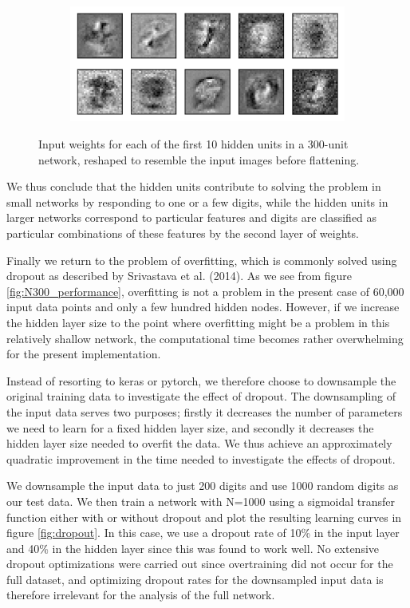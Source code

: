 \documentclass{article}
\begin{document}
\begin{figure}[h]
	\centering
	\begin{subfigure}[t]{0.92\linewidth}
		\includegraphics[width = 1.0\linewidth, trim={0 0 0 0}, clip=true]{figures/w1s_N300_weightfig.png}
	\end{subfigure}%
\caption{Input weights for each of the first 10 hidden units in a 300-unit network, reshaped to resemble the input images before flattening.}
\label{fig:w1s_N300}
\end{figure}

We thus conclude that the hidden units contribute to solving the problem in small networks by responding to one or a few digits, while the hidden units in larger networks correspond to particular features and digits are classified as particular combinations of these features by the second layer of weights.

Finally we return to the problem of overfitting, which is commonly solved using dropout as described by Srivastava et al. (2014). As we see from figure \ref{fig:N300_performance}, overfitting is not a problem in the present case of 60,000 input data points and only a few hundred hidden nodes. However, if we increase the hidden layer size to the point where overfitting might be a problem in this relatively shallow network, the computational time becomes rather overwhelming for the present implementation.

Instead of resorting to keras or pytorch, we therefore choose to downsample the original training data to investigate the effect of dropout. The downsampling of the input data serves two purposes; firstly it decreases the number of parameters we need to learn for a fixed hidden layer size, and secondly it decreases the hidden layer size needed to overfit the data. We thus achieve an approximately quadratic improvement in the time needed to investigate the effects of dropout.

We downsample the input data to just 200 digits and use 1000 random digits as our test data. We then train a network with N=1000 using a sigmoidal transfer function either with or without dropout and plot the resulting learning curves in figure \ref{fig:dropout}. In this case, we use a dropout rate of 10\% in the input layer and 40\% in the hidden layer since this was found to work well. No extensive dropout optimizations were carried out since overtraining did not occur for the full dataset, and optimizing dropout rates for the downsampled input data is therefore irrelevant for the analysis of the full network.
\end{document}
